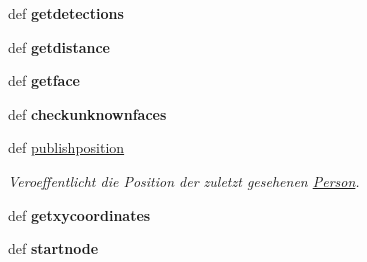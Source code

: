 \begin{DoxyCompactItemize}
\item 
\hypertarget{classpeople2pose_1_1PeopleRec_a22896caa5bdff6528663ba3c7f6d6edf}{def {\bfseries getdetections}}\label{classpeople2pose_1_1PeopleRec_a22896caa5bdff6528663ba3c7f6d6edf}

\item 
\hypertarget{classpeople2pose_1_1PeopleRec_ae76454d181c018864af7f2913856a863}{def {\bfseries getdistance}}\label{classpeople2pose_1_1PeopleRec_ae76454d181c018864af7f2913856a863}

\item 
\hypertarget{classpeople2pose_1_1PeopleRec_af864ebeb87868bc9d64d9b2f51961d88}{def {\bfseries getface}}\label{classpeople2pose_1_1PeopleRec_af864ebeb87868bc9d64d9b2f51961d88}

\item 
\hypertarget{classpeople2pose_1_1PeopleRec_af243d4e7f14b11142319766e39703509}{def {\bfseries checkunknownfaces}}\label{classpeople2pose_1_1PeopleRec_af243d4e7f14b11142319766e39703509}

\item 
def \hyperlink{classpeople2pose_1_1PeopleRec_a52bbb028f80993699ccd221ac490adb7}{publishposition}
\begin{DoxyCompactList}\small\item\em Veroeffentlicht die Position der zuletzt gesehenen \hyperlink{classpeople2pose_1_1Person}{Person}. \end{DoxyCompactList}\item 
\hypertarget{classpeople2pose_1_1PeopleRec_a248f21d4ae0febce40fa3d62514e87d9}{def {\bfseries getxycoordinates}}\label{classpeople2pose_1_1PeopleRec_a248f21d4ae0febce40fa3d62514e87d9}

\item 
\hypertarget{classpeople2pose_1_1PeopleRec_abceaea81a52f2cb34732bb7daf3034ce}{def {\bfseries startnode}}\label{classpeople2pose_1_1PeopleRec_abceaea81a52f2cb34732bb7daf3034ce}

\end{DoxyCompactItemize}
